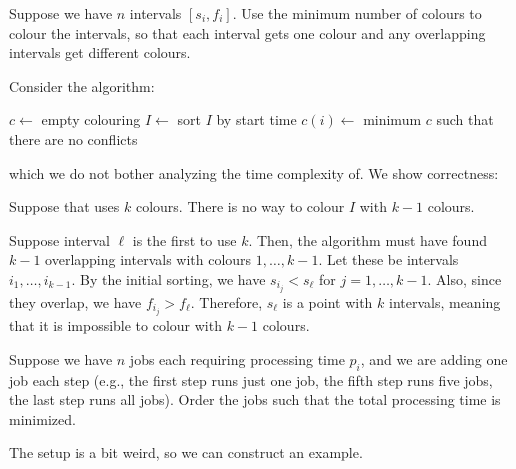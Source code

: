 \begin{problem}
  Suppose we have $n$ intervals $[s_i, f_i]$.
  Use the minimum number of colours to colour the intervals,
  so that each interval gets one colour
  and any overlapping intervals get different colours.
\end{problem}

Consider the algorithm:

\begin{algorithm}[H]
  \caption{\label{alg:g:ic}}
  \begin{algorithmic}[1]
    \State $c \gets$ empty colouring
    \State $I \gets$ sort $I$ by start time
      \State $c(i) \gets$ minimum $c$ such that there are no conflicts
    \EndFor
  \end{algorithmic}
\end{algorithm}

which we do not bother analyzing the time complexity of.
We show correctness:

\begin{prop}
  Suppose that  uses $k$ colours.
  There is no way to colour $I$ with $k-1$ colours.
\end{prop}
\begin{prf}
  Suppose interval $\ell$ is the first to use $k$.
  Then, the algorithm must have found $k-1$ overlapping intervals with colours $1,\dotsc,k-1$.
  Let these be intervals $i_1,\dotsc,i_{k-1}$.
  By the initial sorting, we have $s_{i_j} < s_\ell$ for $j = 1,\dotsc,k-1$.
  Also, since they overlap, we have $f_{i_j} > f_\ell$.
  Therefore, $s_\ell$ is a point with $k$ intervals,
  meaning that it is impossible to colour with $k-1$ colours.
\end{prf}

\begin{problem}
  Suppose we have $n$ jobs each requiring processing time $p_i$,
  and we are adding one job each step (e.g., the first step runs just one job,
  the fifth step runs five jobs, the last step runs all jobs).
  Order the jobs such that the total processing time is minimized.
\end{problem}

The setup is a bit weird, so we can construct an example.

